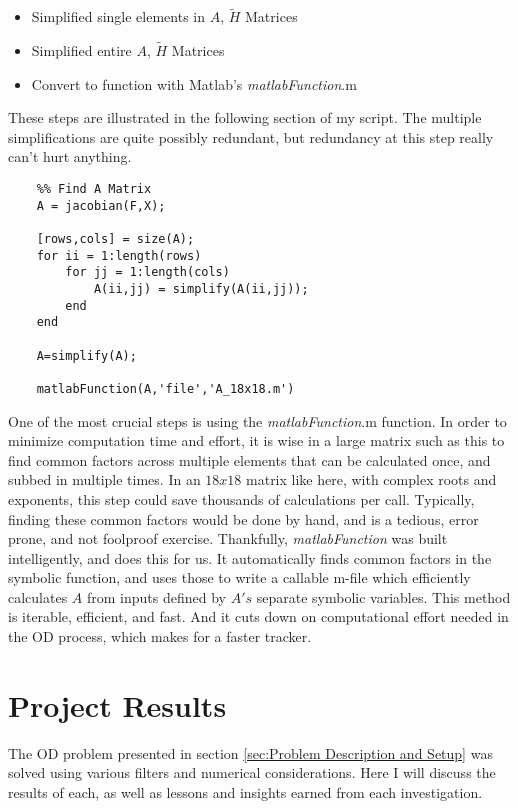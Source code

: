 \documentclass[12pt,a4paper,oneside]{article}
\numberwithin{equation}{section}   		%
\begin{document}
\begin{itemize}
	\item Simplified single elements in $A$, $\tilde{H}$ Matrices
	\item Simplified entire $A$, $\tilde{H}$ Matrices
	\item Convert to function with Matlab's \emph{matlabFunction}.m
\end{itemize}

These steps are illustrated in the following section of my script. The multiple simplifications are quite possibly redundant, but redundancy at this step really can't hurt anything. 

\begin{lstlisting}
	%% Find A Matrix
	A = jacobian(F,X);
	
	[rows,cols] = size(A);
	for ii = 1:length(rows)
	    for jj = 1:length(cols)
	        A(ii,jj) = simplify(A(ii,jj));
	    end
	end
	
	A=simplify(A);
	
	matlabFunction(A,'file','A_18x18.m')
\end{lstlisting}

One of the most crucial steps is using the \emph{matlabFunction}.m function. In order to minimize computation time and effort, it is wise in a large matrix such as this to find common factors across multiple elements that can be calculated once, and subbed in multiple times. In an $18x18$ matrix like here, with complex roots and exponents, this step could save thousands of calculations per call. Typically, finding these common factors would be done by hand, and is a tedious, error prone, and not foolproof exercise. Thankfully, \emph{matlabFunction} was built intelligently, and does this for us. It automatically finds common factors in the symbolic function, and uses those to write a callable m-file which efficiently calculates $A$ from inputs defined by $A's$ separate symbolic variables. This method is iterable, efficient, and fast. And it cuts down on computational effort needed in the OD process, which makes for a faster tracker. 


\section{Project Results}
\label{sec:Project Results}
The OD problem presented in section \ref{sec:Problem Description and Setup} was solved using various filters and numerical considerations. Here I will discuss the results of each, as well as lessons and insights earned from each investigation. 
\end{document}
